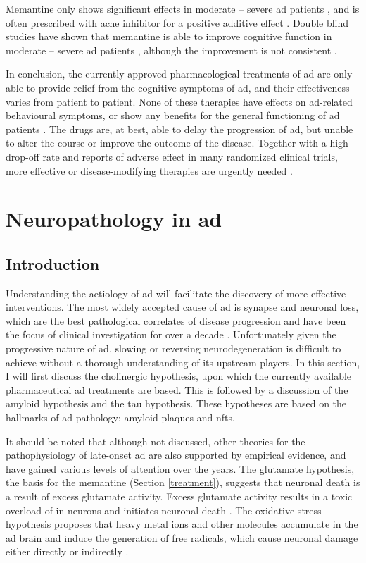 Memantine only shows significant effects in moderate -- severe \gls{ad} patients \citep{reisberg03, tariot04, schneider11}, and is often prescribed with \gls{ache} inhibitor for a positive additive effect \citep{rountree09}. Double blind studies have shown that memantine is able to improve cognitive function in moderate -- severe \gls{ad} patients \citep{reisberg03, tariot04}, although the improvement is not consistent \citep{porsteinsson08}. 

In conclusion, the currently approved pharmacological treatments of \gls{ad} are only able to provide relief from the cognitive symptoms of \gls{ad}, and their effectiveness varies from patient to patient. None of these therapies have effects on \gls{ad}-related behavioural symptoms, or show any benefits for the general functioning of  \gls{ad} patients \citep{tan14}. The drugs are, at best, able to delay the progression of \gls{ad}, but unable to alter the course or improve the outcome of the disease. Together with a high drop-off rate and reports of adverse effect in many randomized clinical trials, more effective or disease-modifying therapies are urgently needed \citep{bond12}. 

\section{Neuropathology in \gls{ad}}
\subsection{Introduction}

Understanding the aetiology of \gls{ad} will facilitate the discovery of more effective interventions. The most widely accepted cause of \gls{ad} is synapse and neuronal loss, which are the best pathological correlates of disease progression and have been the focus of clinical investigation for over a decade \citep{selkoe02, coleman04}. Unfortunately given the progressive nature of \gls{ad}, slowing or reversing neurodegeneration is difficult to achieve without a thorough understanding of its upstream players. In this section, I will first discuss the cholinergic hypothesis, upon which the currently available pharmaceutical \gls{ad} treatments are based. This is followed by a discussion of the amyloid hypothesis and the tau hypothesis. These hypotheses are based on the hallmarks of \gls{ad} pathology: amyloid plaques and \glspl{nft}.

It should be noted that although not discussed, other theories for the pathophysiology of late-onset \gls{ad} are also supported by empirical evidence, and have gained various levels of attention over the years. The glutamate hypothesis, the basis for the memantine (Section \ref{treatment}), suggests that  neuronal death is a result of excess glutamate activity. Excess glutamate activity results in a toxic overload of  in neurons and initiates neuronal death \citep{greenamyre88, parsons07}. The oxidative stress hypothesis proposes that heavy metal ions and other molecules accumulate in the \gls{ad} brain and induce the generation of free radicals, which cause neuronal damage either directly or indirectly \citep{markesbery97, smith10}. 

